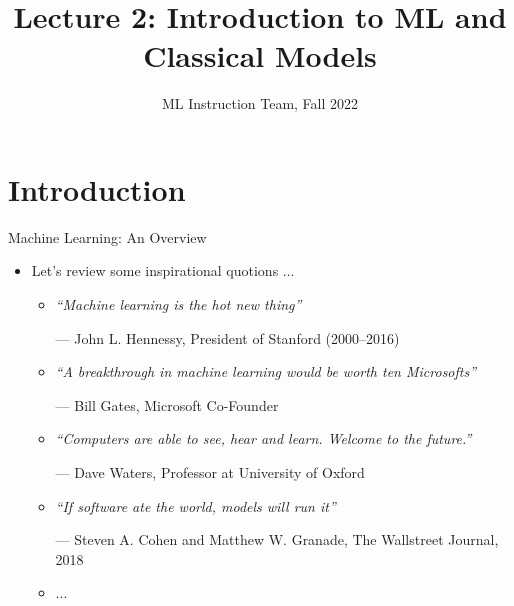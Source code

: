 \documentclass[compress,oilve]{beamer}
\title{Lecture 2: Introduction to ML and Classical Models}
\author{ML Instruction Team, Fall 2022}
\institute[]{CE Department \newline  Sharif University of Technology \newline \newline}
\date[\today]{}
\begin{document}
	
	\fontsize{9}{9}
\begin{frame}
	\titlepage
\end{frame}

\section{Introduction}

\begin{frame}{Machine Learning: An Overview}
\begin{itemize}
\item Let's review some inspirational quotions ... \\
\begin{itemize}
	\item \textit{“Machine learning is the hot new thing”} \\ \begin{center}
— John L. Hennessy, President of Stanford (2000–2016) \end{center}
	\item\textit{ “A breakthrough in machine learning would be worth ten Microsofts” }\\ \begin{center}
— Bill Gates, Microsoft Co-Founder  \end{center}
	\item \textit{“Computers are able to see, hear and learn.  Welcome to the future.” }\\ \begin{center}
— Dave Waters, Professor at University of Oxford \end{center}
	\item \textit{“If software ate the world, models will run it”}
\\ \begin{center}
— Steven A. Cohen and Matthew W. Granade, The Wallstreet Journal, 2018\end{center}
	\item ...
\end{itemize}	
\end{itemize}
\end{frame}
\end{document}

